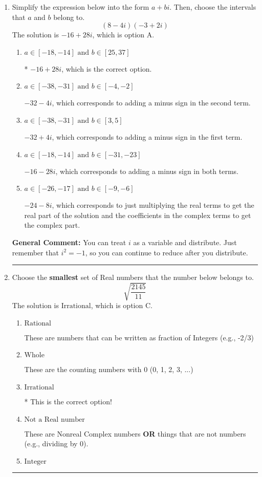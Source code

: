 \documentclass{extbook}[14pt]
\newcommand{\litem}[1]{\item #1

\rule{\textwidth}{0.4pt}}
\begin{document}
\begin{enumerate}\litem{
Simplify the expression below into the form $a+bi$. Then, choose the intervals that $a$ and $b$ belong to.
\[ (8 - 4 i)(-3 + 2 i) \]The solution is \( -16 + 28 i \), which is option A.\begin{enumerate}[label=\Alph*.]
\item \( a \in [-18, -14] \text{ and } b \in [25, 37] \)

* $-16 + 28 i$, which is the correct option.
\item \( a \in [-38, -31] \text{ and } b \in [-4, -2] \)

 $-32 - 4 i$, which corresponds to adding a minus sign in the second term.
\item \( a \in [-38, -31] \text{ and } b \in [3, 5] \)

 $-32 + 4 i$, which corresponds to adding a minus sign in the first term.
\item \( a \in [-18, -14] \text{ and } b \in [-31, -23] \)

 $-16 - 28 i$, which corresponds to adding a minus sign in both terms.
\item \( a \in [-26, -17] \text{ and } b \in [-9, -6] \)

 $-24 - 8 i$, which corresponds to just multiplying the real terms to get the real part of the solution and the coefficients in the complex terms to get the complex part.
\end{enumerate}

\textbf{General Comment:} You can treat $i$ as a variable and distribute. Just remember that $i^2=-1$, so you can continue to reduce after you distribute.
}
\litem{
Choose the \textbf{smallest} set of Real numbers that the number below belongs to.
\[ \sqrt{\frac{2145}{11}} \]The solution is \( \text{Irrational} \), which is option C.\begin{enumerate}[label=\Alph*.]
\item \( \text{Rational} \)

These are numbers that can be written as fraction of Integers (e.g., -2/3)
\item \( \text{Whole} \)

These are the counting numbers with 0 (0, 1, 2, 3, ...)
\item \( \text{Irrational} \)

* This is the correct option!
\item \( \text{Not a Real number} \)

These are Nonreal Complex numbers \textbf{OR} things that are not numbers (e.g., dividing by 0).
\item \( \text{Integer} \)


\end{enumerate}}
\end{enumerate}
\end{document}
